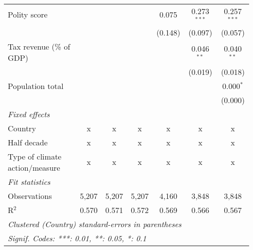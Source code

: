 \begin{tabular}{lcccccc}
   Polity score                                                         &             &              &                & 0.075          & 0.273$^{***}$  & 0.257$^{***}$\\   
                                                                        &             &              &                & (0.148)        & (0.097)        & (0.057)\\   
   Tax revenue (\% of GDP)                                              &             &              &                &                & 0.046$^{**}$   & 0.040$^{**}$\\   
                                                                        &             &              &                &                & (0.019)        & (0.018)\\   
   Population total                                                     &             &              &                &                &                & 0.000$^{*}$\\   
                                                                        &             &              &                &                &                & (0.000)\\   
   \emph{Fixed effects}\\
   Country                                                              & x           & x            & x              & x              & x              & x\\  
   Half decade                                                          & x           & x            & x              & x              & x              & x\\  
   Type of climate action/measure                                       & x           & x            & x              & x              & x              & x\\  
   \midrule \emph{Fit statistics}\\
   Observations                                                         & 5,207       & 5,207        & 5,207          & 4,160          & 3,848          & 3,848\\  
   R$^2$                                                                & 0.570       & 0.571        & 0.572          & 0.569          & 0.566          & 0.567\\  
   \midrule
   \multicolumn{7}{l}{\emph{Clustered (Country) standard-errors in parentheses}}\\
   \multicolumn{7}{l}{\emph{Signif. Codes: ***: 0.01, **: 0.05, *: 0.1}}\\
\end{tabular}
\par\endgroup


